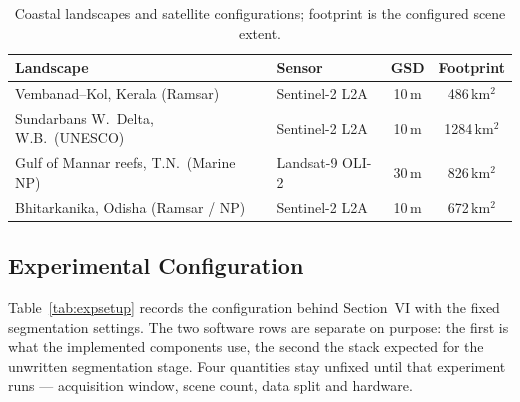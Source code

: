 \documentclass[conference]{IEEEtran}
\begin{document}
\begin{table}[!tbp]
\centering
\caption{Coastal landscapes and satellite configurations; footprint is the configured scene extent.}
\label{tab:studyareas}
\scriptsize
\renewcommand{\arraystretch}{0.95}
\begin{tabularx}{\columnwidth}{@{}>{\raggedright\arraybackslash}X>{\raggedright\arraybackslash}p{1.5cm}cc@{}}
\toprule
\textbf{Landscape} & \textbf{Sensor} & \textbf{GSD} & \textbf{Footprint} \\
\midrule
Vembanad--Kol, Kerala (Ramsar) & Sentinel-2 L2A & 10\,m & 486\,km$^2$ \\
Sundarbans W.\ Delta, W.B.\ (UNESCO) & Sentinel-2 L2A & 10\,m & 1284\,km$^2$ \\
Gulf of Mannar reefs, T.N.\ (Marine NP) & Landsat-9 OLI-2 & 30\,m & 826\,km$^2$ \\
Bhitarkanika, Odisha (Ramsar / NP) & Sentinel-2 L2A & 10\,m & 672\,km$^2$ \\
\bottomrule
\end{tabularx}
\end{table}

\subsection{Experimental Configuration}

Table~\ref{tab:expsetup} records the configuration behind Section~VI with the fixed segmentation settings. The two software rows are separate on purpose: the first is what the implemented components use, the second the stack expected for the unwritten segmentation stage. Four quantities stay unfixed until that experiment runs --- acquisition window, scene count, data split and hardware.
\end{document}

